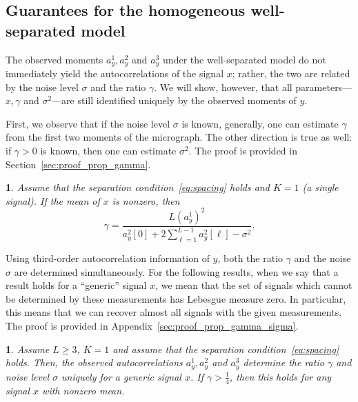 \documentclass[12pt]{article}
\newcommand{\1}{\mathbf{1}}
\theoremstyle{plain}
\theoremstyle{definition}
\theoremstyle{remark}
\theoremstyle{plain}
\theoremstyle{remark}
\theoremstyle{plain}
\theoremstyle{plain}
\theoremstyle{plain}
\newtheorem{proposition}[thm]{\protect\propositionname}
\providecommand{\propositionname}{Proposition}
\numberwithin{equation}{section}
\begin{document}
\subsection{Guarantees for the homogeneous well-separated model} \label{sec:theory_homogeneous_well_separated}
 
The observed moments $a_y^1,a_y^2$ and $a_y^3$ under the well-separated model do not immediately yield the autocorrelations  of the signal $x$; rather, the two are related by the noise level $\sigma$ and the ratio $\gamma$. We will show, however, that all parameters---$x, \gamma$ and $\sigma^2$---are still identified uniquely by the observed moments of $y$.

First, we observe that if  the noise level $\sigma$ is known, generally, one can estimate $\gamma$ from the first two moments of the micrograph.
The other direction is true as well: if $\gamma>0$ is known, then one can estimate $\sigma^2$.
 The proof is provided in Section~\ref{sec:proof_prop_gamma}.

\begin{proposition} \label{prop:gamma}
	Assume that the separation condition~\eqref{eq:spacing} holds and $K=1$ (a single signal). If the mean of $x$ is nonzero, then  
	\begin{equation}
	\gamma  = \frac{L (a^1_y)^2}{a_y^2[0] + 2\sum_{\ell = 1}^{L-1}a_y^2[\ell]-\sigma^2}.
	\end{equation}
\end{proposition}

Using third-order autocorrelation information of $y$, both the ratio $\gamma$ and the noise $\sigma$ are determined simultaneously. For the following results, when we say that a result holds for a ``generic'' signal $x$, we mean that the set of signals which cannot be determined by these measurements
has Lebesgue measure zero. 
In particular, this means that we can recover
almost all signals with the given measurements. The proof is provided in Appendix~\ref{sec:proof_prop_gamma_sigma}.

\begin{proposition} \label{prop:gamma_sigma}
	Assume $L \geq 3$, $K=1$ and assume that the separation condition~\eqref{eq:spacing} holds. 
	Then, the observed autocorrelations $a_y^1,a_y^2$ and  $a_y^3$ determine the ratio $\gamma$ and noise level $\sigma$ uniquely for a generic signal $x$. If $\gamma > \frac{1}{4}$, then this holds for any signal $x$ with nonzero mean. 
\end{proposition}
\end{document}
